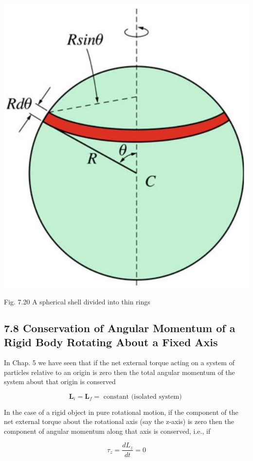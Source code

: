 \documentclass[10pt]{article}
\begin{document}
\begin{center}
\includegraphics[max width=\textwidth]{2024_09_13_db1f357d2aad0a03eb2eg-122(1)}
\end{center}

Fig. 7.20 A spherical shell divided into thin rings

\subsection*{7.8 Conservation of Angular Momentum of a Rigid Body Rotating About a Fixed Axis}
In Chap. 5 we have seen that if the net external torque acting on a system of particles relative to an origin is zero then the total angular momentum of the system about that origin is conserved

$$
\mathbf{L}_{i}=\mathbf{L}_{f}=\text { constant (isolated system) }
$$

In the case of a rigid object in pure rotational motion, if the component of the net external torque about the rotational axis (say the z-axis) is zero then the component of angular momentum along that axis is conserved, i.e., if

$$
\tau_{z}=\frac{d L_{z}}{d t}=0
$$
\end{document}
